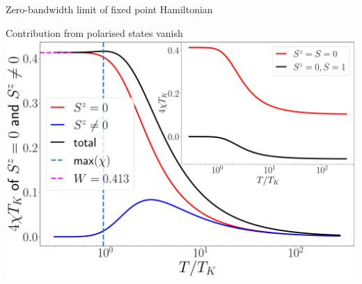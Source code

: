 \documentclass[aspectratio=169]{beamer}
\begin{document}
\begin{frame}[noframenumbering]{Zero-bandwidth limit of fixed point Hamiltonian}
{\begin{minipage}{0.57\textwidth}
{Contribution from polarised states vanish
\includegraphics[width=1.05\textwidth]{figures/chi_parts.pdf}
\vspace*{-40pt}
}
\end{minipage}
}

\end{frame}
\end{document}
